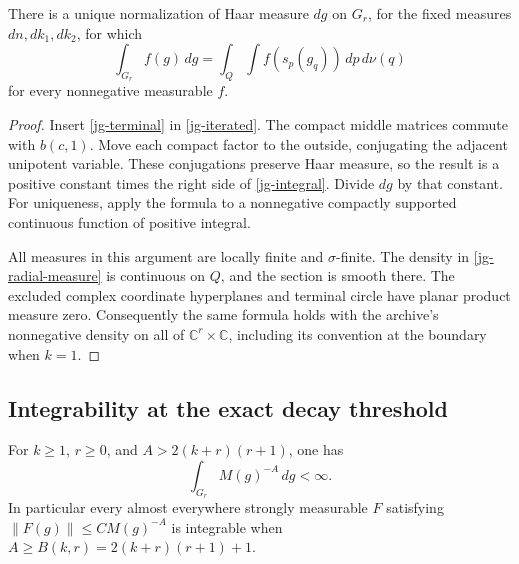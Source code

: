 \begin{theorem}\label{jg-intformula}
There is a unique normalization of Haar measure \(dg\) on
\(G_r\), for the fixed measures \(dn,dk_1,dk_2\), for which
\begin{equation}\label{jg-integral}
       \int_{G_r}f(g)\,dg
        =\int_Q\int f(s_p(g_q))\,dp\,d\nu(q)
\end{equation}
for every nonnegative measurable \(f\).
\end{theorem}

\begin{proof}
Insert \eqref{jg-terminal} in \eqref{jg-iterated}.
The compact middle matrices commute with \(b(c,1)\).
Move each compact factor to the outside, conjugating the
adjacent unipotent variable.  These conjugations preserve
Haar measure, so the result is a positive constant times
the right side of \eqref{jg-integral}.
Divide \(dg\) by that constant.
For uniqueness, apply the formula to a nonnegative compactly
supported continuous function of positive integral.

All measures in this argument are locally finite and
\(\sigma\)-finite.  The density in \eqref{jg-radial-measure}
is continuous on \(Q\), and the section is smooth there.
The excluded complex coordinate hyperplanes and terminal
circle have planar product measure zero.  Consequently the
same formula holds with the archive's nonnegative density on
all of \(\mathbb C^r\times\mathbb C\), including its convention
at the boundary when \(k=1\).
\end{proof}

\subsection{Integrability at the exact decay threshold}

\begin{theorem}\label{jg-lone}
For \(k\geq1\), \(r\geq0\), and
\(A>2(k+r)(r+1)\), one has
\begin{equation}\label{jg-weight-integrable}
                     \int_{G_r}M(g)^{-A}\,dg<\infty .
\end{equation}
In particular every almost everywhere strongly measurable \(F\) satisfying
\(\|F(g)\|\leq C M(g)^{-A}\) is integrable when
\(A\geq B(k,r)=2(k+r)(r+1)+1\).
\end{theorem}

